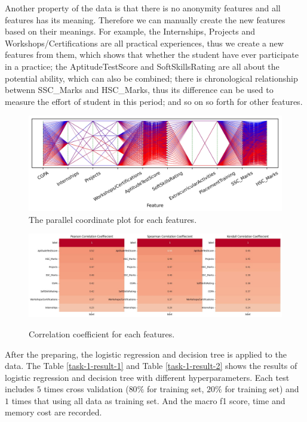 \documentclass[11pt]{article}
\begin{document}
Another property of the data is that there is no anonymity features and all features has its meaning. Therefore we can manually create the new features based on their meanings. For example, the Internships, Projects and Workshops/Certifications are all practical experiences, thus we create a new features from them, which shows that whether the student have ever participate in a practice; the AptitudeTestScore and SoftSkillsRating are all about the potential ability, which can also be combined; there is chronological relationship betwenn SSC\_Marks and HSC\_Marks, thus its difference can be used to measure the effort of student in this period; and so on so forth for other features.

\begin{figure}[H]
  \centering
  \includegraphics[width=\textwidth]{../code/Task1/Analysis/PC.jpg}
  \caption{The parallel coordinate plot for each features.}
  \label{task-1-data-distribution}
\end{figure}

\begin{figure}[H]
  \centering
  \includegraphics[width=\textwidth]{../code/Task1/Analysis/corrcoef.jpg} \\
  \caption{Correlation coefficient for each features.}
  \label{task-1-correlation-coefficient}
\end{figure}

After the preparing, the logistic regression and decision tree is applied to the data. The Table \ref{task-1-result-1} and Table \ref{task-1-result-2} shows the results of logistic regression and decision tree with different hyperparameters. Each test includes $5$ times cross validation ($80\%$ for training set, $20\%$ for training set) and $1$ times that using all data as training set. And the macro f1 score, time and memory cost are recorded.
\end{document}
